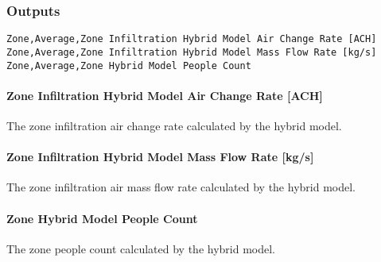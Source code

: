 \subsubsection{Outputs}\label{outputs-030}

\begin{lstlisting}
Zone,Average,Zone Infiltration Hybrid Model Air Change Rate [ACH]
Zone,Average,Zone Infiltration Hybrid Model Mass Flow Rate [kg/s]
Zone,Average,Zone Hybrid Model People Count
\end{lstlisting}

\paragraph{Zone Infiltration Hybrid Model Air Change Rate {[}ACH{]}}\label{zone-infiltration-hybrid-model-air-change-rate}

The zone infiltration air change rate calculated by the hybrid model.

\paragraph{Zone Infiltration Hybrid Model Mass Flow Rate {[}kg/s{]}}\label{zone-infiltration-hybrid-model-air-mass-flow-rate}

The zone infiltration air mass flow rate calculated by the hybrid model.

\paragraph{Zone Hybrid Model People Count}\label{zone-infiltration-hybrid-model-people-count}

The zone people count calculated by the hybrid model.